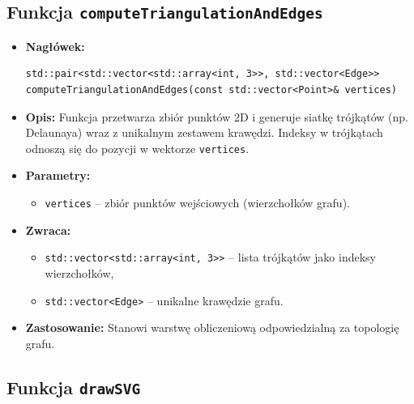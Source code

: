 \documentclass{article}
\begin{document}
\subsection{Funkcja \texttt{computeTriangulationAndEdges}}

\begin{itemize}
    \item \textbf{Nagłówek:}
    \begin{verbatim}
std::pair<std::vector<std::array<int, 3>>, std::vector<Edge>>
computeTriangulationAndEdges(const std::vector<Point>& vertices)
    \end{verbatim}

    \item \textbf{Opis:}
    Funkcja przetwarza zbiór punktów 2D i generuje siatkę trójkątów (np. Delaunaya) wraz z unikalnym zestawem krawędzi. Indeksy w trójkątach odnoszą się do pozycji w wektorze \texttt{vertices}.

    \item \textbf{Parametry:}
    \begin{itemize}
        \item \texttt{vertices} – zbiór punktów wejściowych (wierzchołków grafu).
    \end{itemize}

    \item \textbf{Zwraca:}
    \begin{itemize}
        \item \texttt{std::vector<std::array<int, 3>>} – lista trójkątów jako indeksy wierzchołków,
        \item \texttt{std::vector<Edge>} – unikalne krawędzie grafu.
    \end{itemize}

    \item \textbf{Zastosowanie:}
    Stanowi warstwę obliczeniową odpowiedzialną za topologię grafu.
\end{itemize}

\subsection{Funkcja \texttt{drawSVG}}
\end{document}
